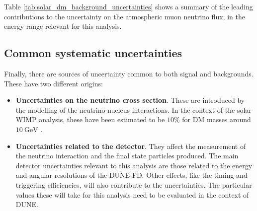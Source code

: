 Table \ref{tab:solar_dm_background_uncertainties} shows a summary of the leading contributions to the uncertainty on the atmospheric muon neutrino flux, in the energy range relevant for this analysis.

\subsection{Common systematic uncertainties}

Finally, there are sources of uncertainty common to both signal and backgrounds. These have two different origins:

\begin{itemize}
	\item \textbf{Uncertainties on the neutrino cross section}. These are introduced by the modelling of the neutrino-nucleus interactions. In the context of the solar WIMP analysis, these have been estimated to be $10\%$ for DM masses around $10~\mathrm{GeV}$ \cite{Boliev2013}.
	\item \textbf{Uncertainties related to the detector}. They affect the measurement of the neutrino interaction and the final state particles produced. The main detector uncertainties relevant to this analysis are those related to the energy and angular resolutions of the DUNE FD. Other effects, like the timing and triggering efficiencies, will also contribute to the uncertainties. The particular values these will take for this analysis need to be evaluated in the context of DUNE.
\end{itemize}
